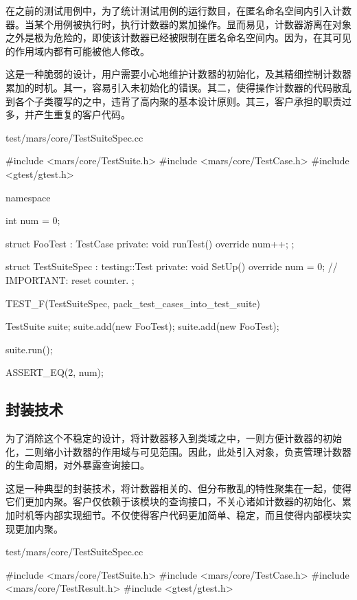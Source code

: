 \begin{content}

在之前的测试用例中，为了统计测试用例的运行数目，在匿名命名空间内引入计数器。当某个用例被执行时，执行计数器的累加操作。显而易见，计数器游离在对象之外是极为危险的，即使该计数器已经被限制在匿名命名空间内。因为，在其可见的作用域内都有可能被他人修改。

这是一种脆弱的设计，用户需要小心地维护计数器的初始化，及其精细控制计数器累加的时机。其一，容易引入未初始化的错误。其二，使得操作计数器的代码散乱到各个子类覆写的之中，违背了高内聚的基本设计原则。其三，客户承担的职责过多，并产生重复的客户代码。

\begin{nodiff}{test/mars/core/TestSuiteSpec.cc}
 \begin{c++}
#include <mars/core/TestSuite.h>
#include <mars/core/TestCase.h>
#include <gtest/gtest.h>

namespace {
  int num = 0;

  struct FooTest : TestCase {
  private:
    void runTest() override {
      num++;
    }
  };

  struct TestSuiteSpec : testing::Test {
  private:
    void SetUp() override {
      num = 0;  // IMPORTANT: reset counter.
    }
  };
}

TEST_F(TestSuiteSpec, pack_test_cases_into_test_suite) {
  TestSuite suite;
  suite.add(new FooTest);
  suite.add(new FooTest);

  suite.run();

  ASSERT_EQ(2, num);
}
 \end{c++}
\end{nodiff}

\subsection{封装技术}

为了消除这个不稳定的设计，将计数器移入到类域之中，一则方便计数器的初始化，二则缩小计数器的作用域与可见范围。因此，此处引入对象，负责管理计数器的生命周期，对外暴露查询接口。

这是一种典型的封装技术，将计数器相关的、但分布散乱的特性聚集在一起，使得它们更加内聚。客户仅依赖于该模块的查询接口，不关心诸如计数器的初始化、累加时机等内部实现细节。不仅使得客户代码更加简单、稳定，而且使得内部模块实现更加内聚。

\begin{nodiff}{test/mars/core/TestSuiteSpec.cc}
 \begin{c++}
#include <mars/core/TestSuite.h>
#include <mars/core/TestCase.h>
#include <mars/core/TestResult.h>
#include <gtest/gtest.h>


\end{c++}
\end{nodiff}
\end{content}
